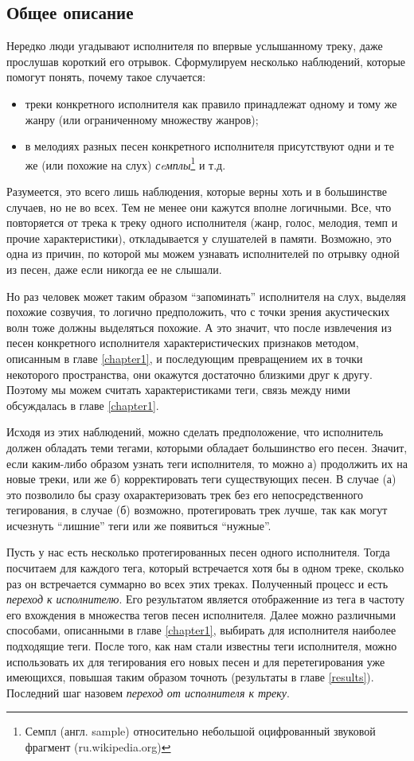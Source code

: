 \subsection{Общее описание}

Нередко люди угадывают исполнителя по впервые услышанному треку, даже прослушав короткий его отрывок.
Сформулируем несколько наблюдений, которые помогут понять, почему такое случается:
\begin{itemize}
 \item треки конкретного исполнителя как правило принадлежат одному и тому же жанру (или ограниченному множеству жанров);
 \item в мелодиях разных песен конкретного исполнителя присутствуют одни и те же (или похожие на слух) \emph{сeмплы}\footnote{Семпл (англ. sample) \ld 
 относительно небольшой оцифрованный звуковой фрагмент (ru.wikipedia.org)} и т.д.
\end{itemize}
Разумеется, это всего лишь наблюдения, которые верны хоть и в большинстве случаев, но не во всех. Тем не менее они кажутся вполне логичными.
Все, что повторяется от трека к треку одного исполнителя (жанр, голос, мелодия, темп и прочие характеристики), откладывается у слушателей в памяти.
Возможно, это одна из причин, по которой мы можем узнавать исполнителей по отрывку одной из песен, даже если никогда ее не слышали.

Но раз человек может таким образом ``запоминать'' исполнителя на слух, выделяя похожие созвучия, то логично предположить, что с точки зрения акустических волн тоже должны выделяться похожие.
А это значит, что после извлечения из песен конкретного исполнителя  характеристических признаков методом, описанным в главе \ref{chapter1}, 
и последующим превращением их в точки некоторого пространства, они окажутся достаточно близкими друг к другу. 
Поэтому мы можем считать характеристиками теги, связь между ними обсуждалась в главе \ref{chapter1}.

Исходя из этих наблюдений, можно сделать предположение, что исполнитель должен обладать теми тегами, которыми обладает большинство его песен.
Значит, если каким-либо образом узнать теги исполнителя, то можно а) продолжить их на новые треки, или же б) корректировать теги существующих песен.
В случае (а) это позволило бы сразу охарактеризовать трек без его непосредственного тегирования, в случае (б) \ld возможно, 
протегировать трек лучше, так как могут исчезнуть ``лишние'' теги или же появиться ``нужные''.

Пусть у нас есть несколько протегированных песен одного исполнителя. Тогда посчитаем для каждого тега, который встречается хотя бы в одном треке, сколько раз он встречается суммарно во всех этих треках.
Полученный процесс и есть \emph{переход к исполнителю}. Его результатом является отображенние из тега в частоту его вхождения в множества тегов песен исполнителя. 
Далее можно различными способами, описанными в главе \ref{chapter1}, выбирать для исполнителя наиболее подходящие теги. После того, как нам стали известны теги исполнителя, можно использовать их для 
тегирования его новых песен и для перетегирования уже имеющихся, повышая таким образом точноть (результаты в главе \ref{results}). Последний шаг назовем \emph{переход от исполнителя к треку}.

